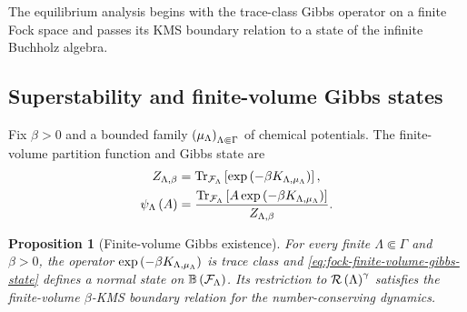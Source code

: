 \documentclass[11pt,a4paper]{article}
\theoremstyle{plain}
\newtheorem{prop}[thm]{Proposition}
\theoremstyle{definition}
\theoremstyle{remark}
\begin{document}
The equilibrium analysis begins with the trace-class Gibbs operator on a finite Fock space and passes its KMS boundary relation to a state of the infinite Buchholz algebra.

\subsection{Superstability and finite-volume Gibbs states}\label{superstability-and-finite-volume-gibbs-states}

Fix \(\beta > 0\) and a bounded family \(\seq{\smchemicalpotential_{\Lambda}}{\Lambda \Subset \Gamma}\) of chemical potentials. The finite-volume partition function and Gibbs state are \begin{equation}
\begin{aligned}
Z_{\Lambda,\beta}
& =
\sqfun{\trace_{\sphilb{F}_{\Lambda}}}{
\fnexp{-\beta K_{\Lambda,\smchemicalpotential_{\Lambda}}}},
\\
\fun{\oastate[\psi_{\Lambda}]}{A}
& =
\frac{
\sqfun{\trace_{\sphilb{F}_{\Lambda}}}{
A\fnexp{-\beta K_{\Lambda,\smchemicalpotential_{\Lambda}}}}}
{Z_{\Lambda,\beta}}.
\end{aligned}
\label{eq:fock-finite-volume-gibbs-state}
\end{equation}

\begin{prop}[Finite-volume Gibbs existence]\label{prop:fock-finite-volume-gibbs-existence}
For every finite $\Lambda \Subset \Gamma$ and $\beta > 0$, the operator
$\fnexp{-\beta K_{\Lambda,\smchemicalpotential_{\Lambda}}}$ is trace class and
\eqref{eq:fock-finite-volume-gibbs-state} defines a normal state on $\opspbddlin{\sphilb{F}_{\Lambda}}$.
Its restriction to $\mathcal{R} \left( \Lambda \right)^{\gamma}$ satisfies the finite-volume $\beta$-KMS
boundary relation for the number-conserving dynamics.
\end{prop}
\end{document}
